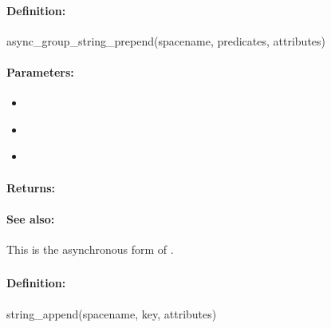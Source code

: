 \paragraph{Definition:}
\begin{rubycode}
async_group_string_prepend(spacename, predicates, attributes)
\end{rubycode}

\paragraph{Parameters:}
\begin{itemize}[noitemsep]
\item {}\\

\item {}\\

\item {}\\

\end{itemize}

\paragraph{Returns:}


\paragraph{See also:}  This is the asynchronous form of .

\pagebreak
\subsubsection{}
\label{api:ruby:string_append}


\paragraph{Definition:}
\begin{rubycode}
string_append(spacename, key, attributes)
\end{rubycode}

